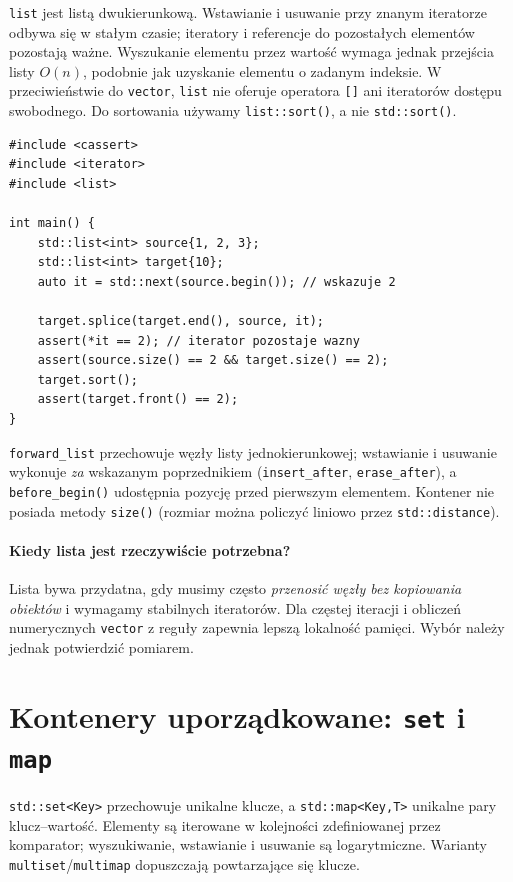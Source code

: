 \texttt{list} jest listą dwukierunkową. Wstawianie i usuwanie przy
znanym iteratorze odbywa się w stałym czasie; iteratory i referencje
do pozostałych elementów pozostają ważne. Wyszukanie elementu przez
wartość wymaga jednak przejścia listy $O(n)$, podobnie jak uzyskanie
elementu o zadanym indeksie. W przeciwieństwie do \texttt{vector},
\texttt{list} nie oferuje operatora \texttt{[]} ani iteratorów dostępu
swobodnego. Do sortowania używamy \texttt{list::sort()}, a nie
\texttt{std::sort()}.

\begin{lstlisting}[caption={Przeniesienie wezla przez list::splice (C++11); kompletny program.}]
#include <cassert>
#include <iterator>
#include <list>

int main() {
    std::list<int> source{1, 2, 3};
    std::list<int> target{10};
    auto it = std::next(source.begin()); // wskazuje 2

    target.splice(target.end(), source, it);
    assert(*it == 2); // iterator pozostaje wazny
    assert(source.size() == 2 && target.size() == 2);
    target.sort();
    assert(target.front() == 2);
}
\end{lstlisting}

\texttt{forward\_list} przechowuje węzły listy jednokierunkowej;
wstawianie i usuwanie wykonuje \emph{za} wskazanym poprzednikiem
(\texttt{insert\_after}, \texttt{erase\_after}), a \texttt{before\_begin()}
udostępnia pozycję przed pierwszym elementem. Kontener nie posiada
metody \texttt{size()} (rozmiar można policzyć liniowo przez
\texttt{std::distance}).

\paragraph{Kiedy lista jest rzeczywiście potrzebna?}
Lista bywa przydatna, gdy musimy często \emph{przenosić węzły bez
kopiowania obiektów} i wymagamy stabilnych iteratorów. Dla częstej
iteracji i obliczeń numerycznych \texttt{vector} z reguły zapewnia
lepszą lokalność pamięci. Wybór należy jednak potwierdzić pomiarem.

\section{Kontenery uporządkowane: \texttt{set} i \texttt{map}}
\label{sec:cpp13-ordered}

\texttt{std::set<Key>} przechowuje unikalne klucze, a
\texttt{std::map<Key,T>} unikalne pary klucz--wartość. Elementy są
iterowane w kolejności zdefiniowanej przez komparator; wyszukiwanie,
wstawianie i usuwanie są logarytmiczne. Warianty
\texttt{multiset}/\texttt{multimap} dopuszczają powtarzające się klucze.

